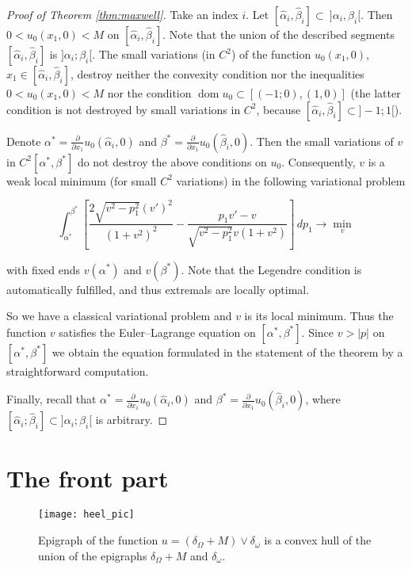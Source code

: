 \documentclass[14pt]{extarticle}
\DeclareMathOperator{\dom}{\mathrm{dom}}
\theoremstyle{remark}
\theoremstyle{definition}
\begin{document}
\begin{proof}[Proof of Theorem \ref{thm:maxwell}]
Take an index $i$. Let  $[\hat\alpha_i,\hat\beta_i]\subset\ ]\alpha_i,\beta_i[$. Then $0<u_0(x_1,0)<M$ on $[\hat\alpha_i,\hat\beta_i]$. Note that the union of the described segments $[\hat\alpha_i,\hat\beta_i]$ is $]\alpha_i;\beta_i[$. The small variations (in $C^2$) of the function $u_0(x_1,0)$, $x_1\in[\hat\alpha_i,\hat\beta_i]$, destroy neither the convexity condition nor the inequalities $0<u_0(x_1,0)<M$ nor the condition $\dom u_0\subset [(-1;0),(1,0)]$ (the latter condition is not destroyed by small variations in $C^2$, because  $[\hat\alpha_i,\hat\beta_i]\subset]-1;1[$).

Denote $\alpha^*=\frac{\partial}{\partial x_1}u_0(\hat\alpha_i,0)$ and $\beta^*=\frac{\partial}{\partial x_1}u_0(\hat\beta_i,0)$. Then the small variations of $v$ in $C^2[\alpha^*,\beta^*]$ do not destroy the above conditions on $u_0$. Consequently, $v$ is a weak local minimum (for small $C^2$ variations) in the following variational problem

\[
	\int_{\alpha^*}^{\beta^*}\left[
		\frac{2\sqrt{v^2-p_1^2}(v')^2}{(1+v^2)^2} - \frac{p_1v'-v}{\sqrt{v^2-p_1^2}v(1+v^2)}
	\right]\,dp_1\to\min_v
\]

\noindent with fixed ends $v(\alpha^*)$ and $v(\beta^*)$. Note that the Legendre condition is automatically fulfilled, and thus extremals are locally optimal.

So we have a classical variational problem and $v$ is its local minimum. Thus the function $v$ satisfies the Euler--Lagrange equation on $[\alpha^*,\beta^*]$. Since $v>|p|$ on $[\alpha^*,\beta^*]$ we obtain the equation formulated in the statement of the theorem by a straightforward computation.

Finally, recall that $\alpha^*=\frac{\partial}{\partial x_1}u_0(\hat\alpha_i,0)$ and $\beta^*=\frac{\partial}{\partial x_1}u_0(\hat\beta_i,0)$, where $[\hat\alpha_i;\hat\beta_i]\subset]\alpha_i;\beta_i[$ is arbitrary.

\end{proof}


\section{The front part}
\label{sec:heel}


\begin{figure}
  \begin{center}
    \texttt{[image: heel\_pic]}
  \end{center}
  \caption{Epigraph of the function $u = (\delta_\Omega + M)\vee \delta_\omega$ is a convex hull of the union of the epigraphs $\delta_\Omega + M$ and $\delta_\omega$.}
  \label{fig:heel}
\end{figure}
\end{document}
